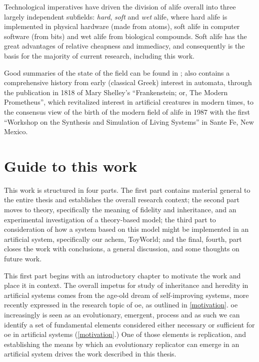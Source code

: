 Technological imperatives have driven the division of \gls{alife} overall into three largely independent subfields: \emph{hard}, \emph{soft} and \emph{wet} \gls{alife}, where hard \gls{alife} is implemented in physical hardware (made from atoms), soft \gls{alife} in computer software (from bits) and wet \gls{alife} from biological compounds. Soft \gls{alife} has the great advantages of relative cheapness and immediacy, and consequently is the basis for the majority of current research, including this work.

Good summaries of the state of the field can be found in \textcite{Aicardi2010,Aguilar2014}; \textcite{Aguilar2014} also contains a comprehensive history from early (classical Greek) interest in automata, through the publication in 1818 of Mary Shelley's ``Frankenstein; or, The Modern Prometheus'', which revitalized interest in artificial creatures in modern times, to the consensus view of the birth of the modern field of \gls{alife} in 1987 with the first ``Workshop on the Synthesis and Simulation of Living Systems'' in Sante Fe, New Mexico.

\section{Guide to this work}

This work is structured in four parts. The first part contains material general to the entire thesis and establishes the overall research context; the second part moves to theory, specifically the meaning of fidelity and inheritance, and an experimental investigation of a theory-based model; the third part to consideration of how a system based on this model might be implemented in an artificial system, specifically our \gls{achem}, ToyWorld; and the final, fourth, part closes the work with conclusions, a general discussion, and some thoughts on future work.

This first part begins with an introductory chapter to motivate the work and place it in context. The overall impetus for study of inheritance and heredity in artificial systems comes from the age-old dream of self-improving systems, more recently expressed in the research topic of \gls{oe}, as outlined in \cref{motivation}. \Gls{oe} increasingly is seen as an evolutionary, emergent, process and as such we can identify a set of fundamental elements considered either necessary or sufficient for \gls{oe} in artificial systems (\cref{motivation}.) One of those elements is replication, and establishing the means by which an evolutionary replicator can emerge in an artificial system drives the work described in this thesis.

